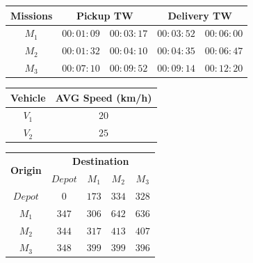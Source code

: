 \documentclass[a4paper,10pt]{article}
\begin{document}
\begin{figure}[h]
\label{example}
 \tiny
 \begin{center}
    \begin{tabular}{|c|c|c|c|c|} 
    \hline
    {\bf Missions} & \multicolumn{2}{|c|}{\bf Pickup TW} & \multicolumn{2}{|c|}{\bf Delivery TW} \\ \hline
    $M_1$	 & $00:01:09$ & $00:03:17$	& $00:03:52$ & $00:06:00$\\
    $M_2$	 & $00:01:32$ & $00:04:10$	& $00:04:35$ & $00:06:47$\\
    $M_3$	 & $00:07:10$ & $00:09:52$	& $00:09:14$ & $00:12:20$\\
    \hline

    \end{tabular}
\end{center}
\begin{center}
    \begin{tabular}{|c|c|} 
    \hline
    {\bf Vehicle} & {\bf AVG Speed (km/h)} \\ \hline
    $V_1$	 & $20$\\
    $V_2$	 & $25$\\
    
    \hline

    \end{tabular}
  \end{center}
  
  \begin{center}
    \begin{tabular}{|c|c|c|c|c|} 
    \hline
    \multirow{2}{*}{\bf{Origin}} & \multicolumn{4}{c|}{\bf{Destination}}\\ \cline{2-5}
    	 	& {\bf $Depot$}	& {\bf $M_1$}	& $M_2$		& $M_3$\\ \hline
    {\bf $Depot$}	& $0$		& $173$		& $334$		& $328$\\
    {\bf $M_1$}		& $347$		& $306$		& $642$		& $636$\\
    {\bf $M_2$}		& $344$		& $317$		& $413$		& $407$\\
    {\bf $M_3$}		& $348$		& $399$		& $399$		& $396$\\
    \hline
    \end{tabular}

  \end{center}


\end{figure}
\end{document}
